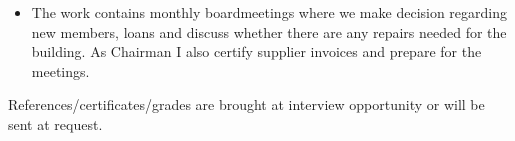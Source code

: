\documentclass[10pt,a4paper,ragged2e]{altacv}
\begin{document}
\begin{fullwidth}
\divider

\begin{itemize}
  \item The work contains monthly boardmeetings where we make decision regarding new members, 
  loans and discuss whether there are any repairs needed for the building. As Chairman I also certify 
  supplier invoices and prepare for the meetings.
\end{itemize}

\divider


\divider


\divider


References/certificates/grades are brought at interview opportunity or will be sent at request.

\end{fullwidth}
\end{document}
